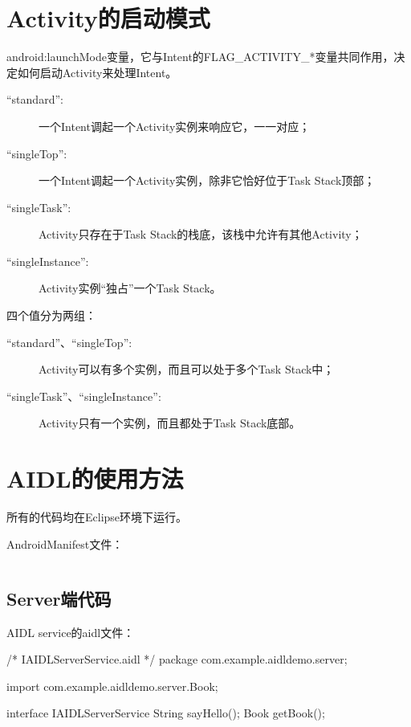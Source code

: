 ﻿\documentclass[a4paper,11pt]{article}
\begin{document}

  \section[Activity的启动模式]{Activity的启动模式}
  android:launchMode变量，它与Intent的FLAG\_ACTIVITY\_*变量共同作用，决定如何启动Activity来处理Intent。

  \begin{description}
    \item[``standard'':] 一个Intent调起一个Activity实例来响应它，一一对应；
    \item[``singleTop'':] 一个Intent调起一个Activity实例，除非它恰好位于Task Stack顶部；
    \item[``singleTask'':] Activity只存在于Task Stack的栈底，该栈中允许有其他Activity；
    \item[``singleInstance'':] Activity实例“独占”一个Task Stack。
  \end{description}

  四个值分为两组：

  \begin{description}
    \item[``standard''、``singleTop'':] Activity可以有多个实例，而且可以处于多个Task Stack中；
    \item[``singleTask''、``singleInstance'':] Activity只有一个实例，而且都处于Task Stack底部。
  \end{description}
  
  
  \section[AIDL的使用方法]{AIDL的使用方法}
  所有的代码均在Eclipse环境下运行。\par\bigskip
  AndroidManifest文件：\par
  \inputminted[linenos,tabsize=4,bgcolor=srcbg]{xml}{AIDLManifest.xml}
  
  \subsection[Server端代码]{Server端代码}
  AIDL service的aidl文件：\par
  \begin{javacode}
/* IAIDLServerService.aidl */
package com.example.aidldemo.server;

import com.example.aidldemo.server.Book;

interface IAIDLServerService {
    String sayHello();
    Book getBook();
}
  \end{javacode}
  
\end{document}
